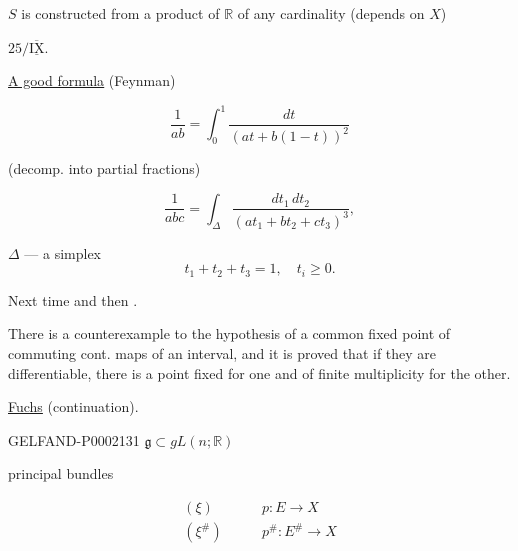 $S$ is constructed from a product of $\mathbb R$ of any cardinality (depends on $X$)



$25/\overline{\underline{\mathrm{IX}}}$.



\underline{\underline{A good formula}} (Feynman)



\begin{equation*}\frac{1}{ab}=\int_0^1\frac{dt}{(at+b (1-t))^2}\end{equation*}



(decomp. into partial fractions)



\begin{equation*}\frac{1}{abc}=\int_\Delta\frac{dt_1\, dt_2}{(at_1+bt_2+ct_3)^3},\end{equation*}



$\Delta$ --- a simplex
\begin{equation*}t_1+t_2+t_3=1,\quad t_i\geq0.\end{equation*}



Next time  and then .



There is a counterexample to the hypothesis of a common fixed point of commuting cont. maps of an interval, and it is proved
that if they are differentiable, there is a point fixed for one and of finite multiplicity for the other.





\underline{Fuchs} (continuation).



\begin{GelfandAdjacentEvidence}{GELFAND-P000213}{1}
$\mathfrak g\subset gL (n;\mathbb R)$
\end{GelfandAdjacentEvidence}

principal bundles



\begin{equation*}\begin{aligned}(\xi)&\qquad p: E\longrightarrow X\\(\xi^{\#})&\qquad p^{\#}: E^{\#}\longrightarrow X\end{aligned}\end{equation*}




